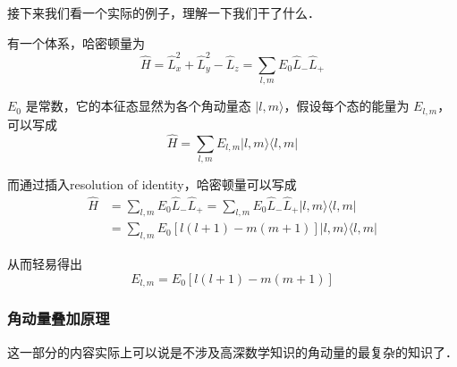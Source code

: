 接下来我们看一个实际的例子，理解一下我们干了什么．

\begin{exam}{}
有一个体系，哈密顿量为
\begin{equation}
\hat H = \hat L_x^2 + \hat L_y^2 -\hat  L_z = \sum_{l,m} E_0 \hat L_-\hat L_+
\end{equation}

$E_0$ 是常数，它的本征态显然为各个角动量态 $|l,m\rangle$，假设每个态的能量为 $E_{l,m}$，可以写成
\begin{equation}
\hat H = \sum_{l,m}E_{l,m}|l,m\rangle\langle l,m|
\end{equation}

而通过插入resolution of identity，哈密顿量可以写成
\begin{equation}
\begin{split}
\hat H &= \sum_{l,m} E_0 \hat L_-\hat L_+ = \sum_{l,m} E_0 \hat L_-\hat L_+ |l,m\rangle \langle l,m|\\ &= \sum_{l,m} E_0 \left[l(l+1)-m(m+1)\right]|l,m\rangle \langle l,m|
\end{split}
\end{equation}

从而轻易得出
\begin{equation}
E_{l,m} = E_0 \left[l(l+1)-m(m+1)\right]
\end{equation}
\end{exam}

\subsubsection{角动量叠加原理}

这一部分的内容实际上可以说是不涉及高深数学知识的角动量的最复杂的知识了．

